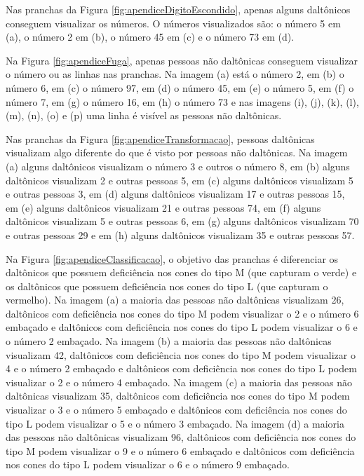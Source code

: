 \documentclass[	12pt, Times, openright, twoside, a4paper, english, brazil]{abntex2}
\begin{document}
\begin{apendicesenv}
Nas pranchas da Figura \ref{fig:apendiceDigitoEscondido}, apenas alguns daltônicos conseguem visualizar os números. O números visualizados são: o número 5 em (a), o número 2 em (b), o número 45 em (c) e o número 73 em (d).

Na Figura \ref{fig:apendiceFuga},  apenas pessoas não daltônicas conseguem visualizar o número ou as linhas nas pranchas. Na imagem (a) está o número 2, em (b) o número 6, em (c) o número 97, em (d) o número 45, em (e) o número 5, em (f) o número 7, em (g) o número 16, em (h) o número 73 e nas imagens (i), (j), (k), (l), (m), (n), (o) e (p) uma linha é visível as pessoas não daltônicas.

Nas pranchas da Figura \ref{fig:apendiceTransformacao}, pessoas daltônicas visualizam algo diferente do que é visto por pessoas não daltônicas. Na imagem (a) alguns daltônicos visualizam o número 3 e outros o número 8, em (b) alguns daltônicos visualizam 2 e outras pessoas 5, em (c) alguns daltônicos visualizam 5 e outras pessoas 3, em (d) alguns daltônicos visualizam 17 e outras pessoas 15, em (e) alguns daltônicos visualizam 21 e outras pessoas 74, em (f) alguns daltônicos visualizam 5 e outras pessoas 6, em (g) alguns daltônicos visualizam 70 e outras pessoas 29 e em (h) alguns daltônicos visualizam 35 e outras pessoas 57.

Na Figura \ref{fig:apendiceClassificacao}, o objetivo das pranchas é diferenciar os daltônicos que possuem deficiência nos cones do tipo M (que capturam o verde) e os daltônicos que possuem deficiência nos cones do tipo L (que capturam o vermelho). Na imagem (a) a maioria das pessoas não daltônicas visualizam 26, daltônicos com deficiência nos cones do tipo M podem visualizar o 2 e o número 6 embaçado e daltônicos com deficiência nos cones do tipo L podem visualizar o 6 e o número 2 embaçado. Na imagem (b) a maioria das  pessoas não daltônicas visualizam 42, daltônicos com deficiência nos cones do tipo M podem visualizar o 4 e o número 2 embaçado e daltônicos com deficiência nos cones do tipo L podem visualizar o 2 e o número 4 embaçado. Na imagem (c) a maioria das  pessoas não daltônicas visualizam 35, daltônicos com deficiência nos cones do tipo M podem visualizar o 3 e o número 5 embaçado e daltônicos com deficiência nos cones do tipo L podem visualizar o 5 e o número 3 embaçado. Na imagem (d) a maioria das pessoas não daltônicas visualizam 96, daltônicos com deficiência nos cones do tipo M podem visualizar o 9 e o número 6 embaçado e daltônicos com deficiência nos cones do tipo L podem visualizar o 6 e o número 9 embaçado. 


\end{apendicesenv}
\end{document}
